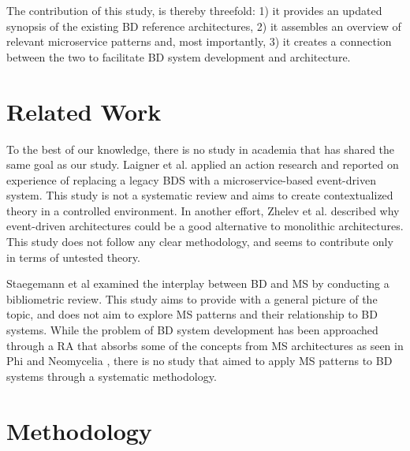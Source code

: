 \documentclass{bmcart}
\begin{document}

The contribution of this study, is thereby threefold: 1) it provides an updated synopsis of the existing BD reference architectures, 2) it assembles an overview of relevant microservice patterns and, most importantly, 3) it creates a connection between the two to facilitate BD system development and architecture.


\section{Related Work}

To the best of our knowledge, there is no study in academia that has shared the same goal as our study. Laigner et al. \cite{laigner2020monolithic} applied an action research and reported on experience of  replacing a legacy BDS with a microservice-based event-driven system. This study is not a systematic review and aims to create contextualized theory in a controlled environment. In another effort,  Zhelev et al. \cite{zhelev2019using} described why event-driven architectures could be a good alternative to monolithic architectures. This study does not follow any clear methodology, and seems to contribute only in terms of untested theory.

Staegemann et al \cite{staegemann2021examining} examined the interplay between BD and MS by conducting a bibliometric review. This study aims to provide with a general picture of the topic, and does not aim to explore MS patterns and their relationship to BD systems.  While the problem of BD system development has been approached through a RA that absorbs some of the concepts from MS architectures as seen in Phi \cite{Phi} and Neomycelia \cite{ataei2021neomycelia}, there is no study that aimed to apply MS patterns to BD systems through a systematic methodology.


\section{Methodology}
\end{document}
